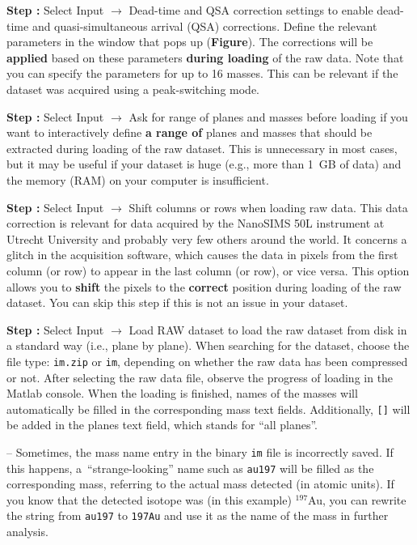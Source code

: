 \documentclass[a4paper, 11pt]{article}
\newcommand{\ttt}[1]{\texttt{#1}}
\newcommand{\lans}[1]{{\color{magenta}#1}}
\newcommand{\lanstf}[1]{{\color{cyan}#1}}
\newcommand\ra{\rightarrow}
\newcommand\addon[1]{-- {\small #1}}
\newcommand\figref[0]{\textbf{Figure}}
\newcounter{step}
\newcommand\s{\addtocounter{step}{1}\noindent\textbf{Step \thestep:}{ }}
\newcommand\bb[1]{\textbf{#1}}
\begin{document}
\s Select \lans{Input} $\ra$ \lans{Dead-time and QSA correction settings} to enable dead-time and quasi-simul\-ta\-neous arrival (QSA) corrections. Define the relevant parameters in the window that pops up (\figref). The corrections will be \bb{applied} based on these parameters \bb{during loading} of the raw data. Note that you can specify the parameters for up to 16 masses. This can be relevant if the dataset was acquired using a peak-switching mode.

\s Select \lans{Input} $\ra$ \lans{Ask for range of planes and masses before loading} if you want to interactively define \bb{a range of} planes and masses that should be extracted during loading of the raw dataset. This is unnecessary in most cases, but it may be useful if your dataset is huge (e.g., more than 1~GB of data) and the memory (RAM) on your computer is insufficient.

\s Select \lans{Input} $\ra$ \lans{Shift columns or rows when loading raw data}. This data correction is relevant for data acquired by the NanoSIMS 50L instrument at Utrecht University and probably very few others around the world. It concerns a glitch in the acquisition software, which causes the data in pixels from the first column (or row) to appear in the last column (or row), or vice versa. This option allows you to \bb{shift} the pixels to the \bb{correct} position during loading of the raw dataset. You can skip this step if this is not an issue in your dataset.

\s Select \lans{Input} $\ra$ \lans{Load RAW dataset} to load the raw dataset from disk in a standard way (i.e., plane by plane). When searching for the dataset, choose the file type: \ttt{im.zip} or \ttt{im}, depending on whether the raw data has been compressed or not. After selecting the raw data file, observe the progress of loading in the Matlab console. When the loading is finished, names of the masses will automatically be filled in the corresponding \lanstf{mass} text fields. Additionally, \ttt{[]} will be added in the \lanstf{planes} text field, which stands for ``all planes''.

\addon{Sometimes, the mass name entry in the binary \ttt{im} file is incorrectly saved. If this happens, a~``strange-looking'' name such as \ttt{au197} will be filled as the corresponding \lanstf{mass}, referring to the actual mass detected (in atomic units). If you know that the detected isotope was (in this example) ${}^{197}$Au, you can rewrite the string from \ttt{au197} to \ttt{197Au} and use it as the name of the mass in further analysis.}
\end{document}
